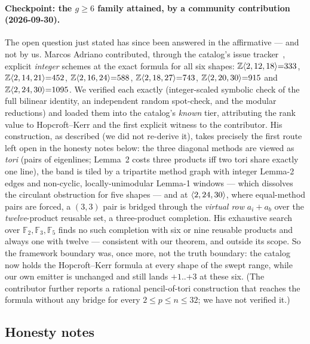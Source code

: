 \paragraph{Checkpoint: the \(g \ge 6\) family attained, by a community
contribution (2026-09-30).} The open question just stated has since been
answered in the affirmative --- and not by us. Marcos Adriano contributed,
through the catalog's issue tracker~\cite{adriano2026hk}, explicit
\emph{integer} schemes at the exact formula for all six shapes:
\(\mathbb{Z}\langle 2, 12, 18 \rangle{=}333\),
\(\mathbb{Z}\langle 2, 14, 21 \rangle{=}452\),
\(\mathbb{Z}\langle 2, 16, 24 \rangle{=}588\),
\(\mathbb{Z}\langle 2, 18, 27 \rangle{=}743\),
\(\mathbb{Z}\langle 2, 20, 30 \rangle{=}915\) and
\(\mathbb{Z}\langle 2, 24, 30 \rangle{=}1095\). We verified each exactly
(integer-scaled symbolic check of the full bilinear identity, an
independent random spot-check, and the modular reductions) and loaded them
into the catalog's \emph{known} tier, attributing the rank value to
Hopcroft--Kerr and the first explicit witness to the contributor. His
construction, as described (we did not re-derive it), takes precisely the
first route left open in the honesty notes below: the three diagonal
methods are viewed as \emph{tori} (pairs of eigenlines; Lemma~2 costs three
products iff two tori share exactly one line), the band is tiled by a
tripartite method graph with integer Lemma-2 edges and non-cyclic,
locally-unimodular Lemma-1 windows --- which dissolves the circulant
obstruction for five shapes --- and at \(\langle 2, 24, 30 \rangle\), where
equal-method pairs are forced, a \((3,3)\) pair is bridged through the
\emph{virtual row} \(a_i{+}a_b\) over the \emph{twelve}-product reusable
set, a three-product completion. His exhaustive search over
\(\mathbb{F}_2,\mathbb{F}_3,\mathbb{F}_5\) finds no such completion with
six or nine reusable products and always one with twelve --- consistent
with our theorem, and outside its scope. So the framework boundary was,
once more, not the truth boundary: the catalog now holds the Hopcroft--Kerr
formula at every shape of the swept range, while our own emitter is
unchanged and still lands \(+1\)..\(+3\) at these six. (The contributor
further reports a rational pencil-of-tori construction that reaches the
formula without any bridge for every \(2 \le p \le n \le 32\); we have not
verified it.)

\subsection{Honesty notes}

